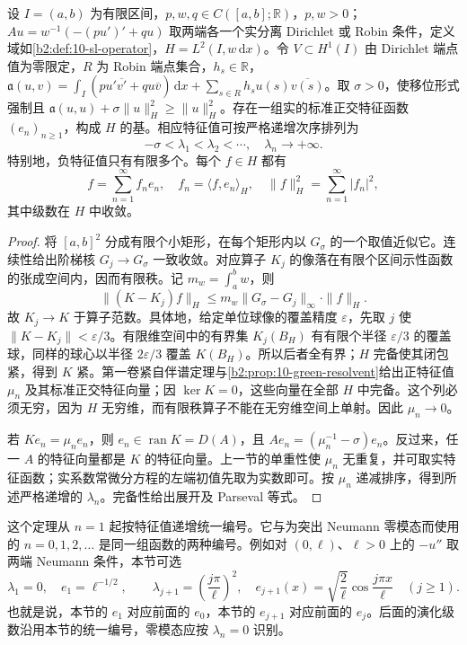 \begin{theorem}\label{b2:thm:10-sl-spectral}
设 \(I=(a,b)\) 为有限区间，\(p,w,q\in C([a,b];\mathbb R)\)，\(p,w>0\)；\(Au=w^{-1}(-(pu')'+qu)\) 取两端各一个实分离 Dirichlet 或 Robin 条件，定义域如\cref{b2:def:10-sl-operator}，\(H=L^2(I,w\,\mathrm dx)\)。令 \(V\subset H^1(I)\) 由 Dirichlet 端点值为零限定，\(R\) 为 Robin 端点集合，\(h_s\in\mathbb R\)，\(\mathfrak a(u,v)=\int_I(pu'\overline{v'}+qu\overline v)\,\mathrm dx+\sum_{s\in R}h_su(s)\overline{v(s)}\)。取 \(\sigma>0\)，使移位形式强制且 \(\mathfrak a(u,u)+\sigma\|u\|_H^2\geq\|u\|_H^2\)。存在一组实的标准正交特征函数 \((e_n)_{n\geq1}\)，构成 \(H\) 的基。相应特征值可按严格递增次序排列为
\[
 -\sigma<\lambda_1<\lambda_2<\cdots,
 \quad\lambda_n\longrightarrow+\infty.
\]
特别地，负特征值只有有限多个。每个 \(f\in H\) 都有
\[
 f=\sum_{n=1}^{\infty}f_ne_n,
 \quad f_n=\langle f,e_n\rangle_H,
 \quad\|f\|_H^2=\sum_{n=1}^{\infty}|f_n|^2,
\]
其中级数在 \(H\) 中收敛。
\end{theorem}
\begin{proof}
将 \([a,b]^2\) 分成有限个小矩形，在每个矩形内以 \(G_\sigma\) 的一个取值近似它。连续性给出阶梯核 \(G_j\to G_\sigma\) 一致收敛。对应算子 \(K_j\) 的像落在有限个区间示性函数的张成空间内，因而有限秩。记 \(m_w=\int_a^bw\)，则
\[
 \|(K-K_j)f\|_H
 \leq m_w\|G_\sigma-G_j\|_\infty\cdot\|f\|_H.
\]
故 \(K_j\to K\) 于算子范数。具体地，给定单位球像的覆盖精度 \(\varepsilon\)，先取 \(j\) 使 \(\|K-K_j\|<\varepsilon/3\)。有限维空间中的有界集 \(K_j(B_H)\) 有有限个半径 \(\varepsilon/3\) 的覆盖球，同样的球心以半径 \(2\varepsilon/3\) 覆盖 \(K(B_H)\)。所以后者全有界；\(H\) 完备使其闭包紧，得到 \(K\) 紧。第一卷紧自伴谱定理与\cref{b2:prop:10-green-resolvent}给出正特征值 \(\mu_n\) 及其标准正交特征向量；因 \(\ker K=0\)，这些向量在全部 \(H\) 中完备。这个列必须无穷，因为 \(H\) 无穷维，而有限秩算子不能在无穷维空间上单射。因此 \(\mu_n\to0\)。

若 \(Ke_n=\mu_ne_n\)，则 \(e_n\in\operatorname{ran}K=D(A)\)，且 \(Ae_n=(\mu_n^{-1}-\sigma)e_n\)。反过来，任一 \(A\) 的特征向量都是 \(K\) 的特征向量。上一节的单重性使 \(\mu_n\) 无重复，并可取实特征函数；实系数常微分方程的左端初值先取为实数即可。按 \(\mu_n\) 递减排序，得到所述严格递增的 \(\lambda_n\)。完备性给出展开及 Parseval 等式。
\end{proof}

这个定理从 \(n=1\) 起按特征值递增统一编号。它与为突出 Neumann 零模态而使用的 \(n=0,1,2,\ldots\) 是同一组函数的两种编号。例如对 \((0,\ell)\)、\(\ell>0\) 上的 \(-u''\) 取两端 Neumann 条件，本节可选
\[
 \lambda_1=0,\quad e_1=\ell^{-1/2},\qquad
 \lambda_{j+1}=\left(\frac{j\pi}{\ell}\right)^2,\quad
 e_{j+1}(x)=\sqrt{\frac2\ell}\cos\frac{j\pi x}{\ell}\quad(j\geq1).
\]
也就是说，本节的 \(e_1\) 对应前面的 \(e_0\)，本节的 \(e_{j+1}\) 对应前面的 \(e_j\)。后面的演化级数沿用本节的统一编号，零模态应按 \(\lambda_n=0\) 识别。

